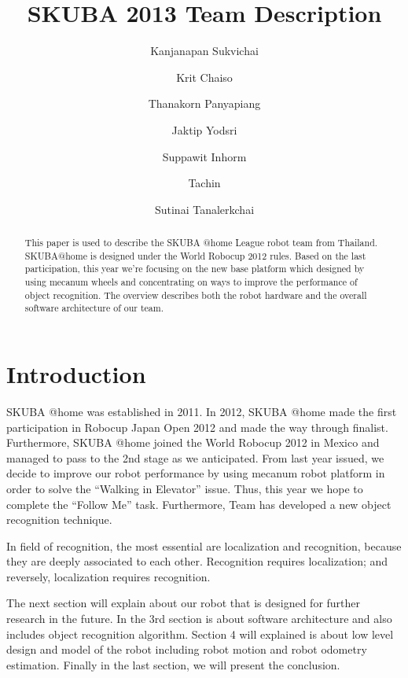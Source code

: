 \documentclass{llncs}
\newcommand{\dq}[1]{``#1''}
\begin{document}
\title{SKUBA 2013 Team Description}
\author{Kanjanapan Sukvichai
\and Krit Chaiso
\and Thanakorn Panyapiang
\and Jaktip Yodsri
\and Suppawit Inhorm
\and Tachin 
\and Sutinai Tanalerkchai
}


\maketitle

\begin{abstract}
This paper is used to describe the SKUBA @home League robot team from Thailand.
SKUBA@home is designed under the World Robocup 2012 rules. 
Based on the last participation, this year we're focusing on the new base platform which designed by using mecanum wheels and concentrating on ways to improve the performance of object recognition.
The overview describes both the robot hardware and the overall software architecture of our team.
\end{abstract}

\section{Introduction}
SKUBA @home was established in 2011. In 2012, SKUBA @home made the first participation in Robocup Japan Open 2012 and made the way through finalist. Furthermore, SKUBA @home joined the World Robocup 2012 in Mexico and managed to pass to the 2nd stage as we anticipated. From last year issued, we decide to improve our robot performance by using mecanum robot platform in order to solve the \dq{Walking in Elevator} issue. Thus, this year we hope to complete the \dq{Follow Me} task. Furthermore, Team has developed a new object recognition technique.

In field of recognition, the most essential are localization and recognition, because they are deeply associated to each other. Recognition requires localization; and reversely, localization requires recognition.

The next section will explain about our robot that is designed for further research in the future. In the 3rd section is about software architecture and also includes object recognition algorithm. Section 4 will explained is about low level design and model of the robot including robot motion and robot odometry estimation. Finally in the last section, we will present the conclusion.
\end{document}
